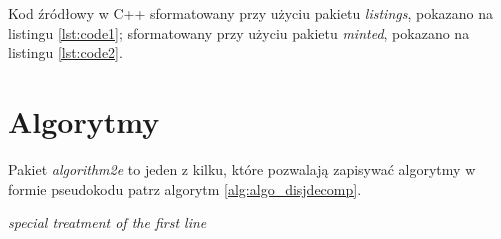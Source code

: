 Kod źródłowy w C++ sformatowany przy użyciu pakietu \emph{listings}, pokazano na listingu \ref{lst:code1}; sformatowany przy użyciu pakietu \emph{minted}, pokazano na listingu \ref{lst:code2}.
\section{Algorytmy}
Pakiet \emph{algorithm2e} \cite{algorithm2e} to jeden z kilku, które pozwalają zapisywać algorytmy w formie pseudokodu \pauza patrz
algorytm \ref{alg:algo_disjdecomp}.

\begin{algorithm}[!htb]
    \caption{Disjoint decomposition.}\label{alg:algo_disjdecomp}
    \BlankLine
    \emph{special treatment of the first line}\;
\end{algorithm}\DecMargin{1em}
